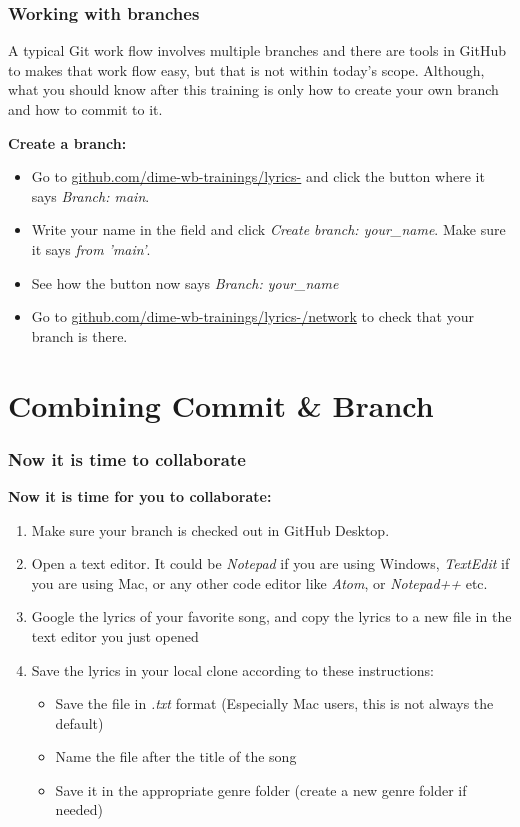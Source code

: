 \documentclass[aspectratio=169]{beamer} %
\newcommand{\trainingURL}[1]{{\color{blue}\url{#1}}}
\newcommand{\traininerUsername}{dime-wb-trainings}
\newcommand{\repoName}{\traininerUsername/lyrics-}
\newcommand{\trainingRepoURL}[1]{\trainingURL{github.com/\repoName #1}}
\begin{document}
\begin{frame}
\frametitle{Working with branches}

	A typical Git work flow involves multiple branches and there are tools in GitHub to makes that work flow easy, but that is not within today's scope. Although, what you should know after this training is only how to create your own branch and how to commit to it.

	\textbf{Create a branch:}
	\begin{itemize}
		\item Go to \trainingRepoURL{} and click the button where it says \textit{Branch: main}.
		\item Write your name in the field and click \textit{Create branch: your\_name}. Make sure it says \textit{from 'main'}.
		\item See how the button now says \textit{Branch: your\_name}
		\item Go to \trainingRepoURL{/network} to check that your branch is there.
	\end{itemize}

\end{frame}

\section{Combining Commit \& Branch}

\begin{frame}
\frametitle{Now it is time to collaborate}

\textbf{Now it is time for you to collaborate:}
\begin{enumerate}
	\item Make sure your branch is checked out in GitHub Desktop.
	\item Open a text editor. It could be \textit{Notepad} if you are using Windows, \textit{TextEdit} if you are using Mac, or any other code editor like \textit{Atom}, or \textit{Notepad++} etc.
	\item Google the lyrics of your favorite song, and copy the lyrics to a new file in the text editor you just opened
	\item Save the lyrics in your local clone according to these instructions:
	\begin{itemize}
		\item Save the file in \textit{.txt} format (Especially Mac users, this is not always the default)
		\item Name the file after the title of the song
		\item Save it in the appropriate genre folder (create a new genre folder if needed)
	\end{itemize}
\end{enumerate}

\end{frame}
\end{document}
